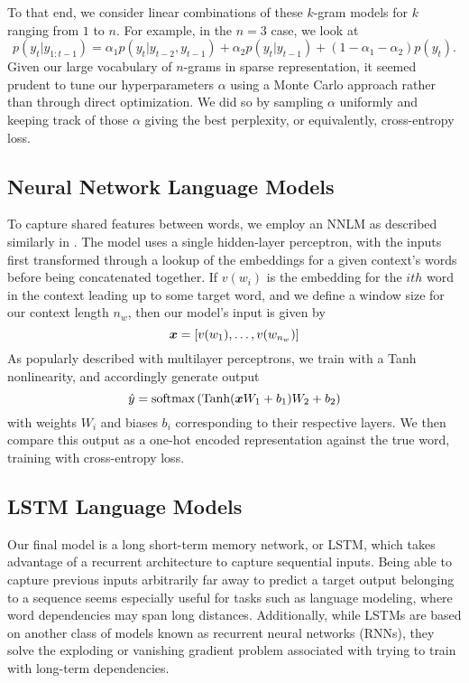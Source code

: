 \documentclass[11pt]{article}
\begin{document}
To that end, we consider linear combinations of these $k$-gram models for $k$ ranging from $1$ to $n$. For example, in the $n=3$ case, we look at
\[p(y_t | y_{1:t-1}) =  \alpha_1 p(y_t | y_{t-2}, y_{t-1}) + \alpha_2 p(y_t | y_{t-1}) + (1 - \alpha_1 - \alpha_2) p(y_t).\]
Given our large vocabulary of $n$-grams in sparse representation, it seemed prudent to tune our hyperparameters $\alpha$ using a Monte Carlo approach rather than through direct optimization. We did so by sampling $\alpha$ uniformly and keeping track of those $\alpha$ giving the best perplexity, or equivalently, cross-entropy loss.

\subsection{Neural Network Language Models}
To capture shared features between words, we employ an NNLM as described similarly in \cite{Bengio:2003:NPL:944919.944966}. The model uses a single hidden-layer perceptron, with the inputs first transformed through a lookup of the embeddings for a given context's words before being concatenated together. If $v(w_i)$ is the embedding for the $ith$ word in the context leading up to some target word, and we define a window size for our context length $n_w$, then our model's input is given by
\[
\boldsymbol{x} = [v(w_1), \ldots, v(w_{n_w})]
\]
As popularly described with multilayer perceptrons, we train with a Tanh nonlinearity, and accordingly generate output
\[
\hat{y} = \text{softmax}\left(\text{Tanh}(\boldsymbol{x} W_1 + b_1)W_2 + b_2\right)
\]
with weights $W_i$ and biases $b_i$ corresponding to their respective layers. We then compare this output as a one-hot encoded representation against the true word, training with cross-entropy loss.

\subsection{LSTM Language Models}
Our final model is a long short-term memory network, or LSTM, which takes advantage of a recurrent architecture to capture sequential inputs. Being able to capture previous inputs arbitrarily far away to predict a target output belonging to a sequence seems especially useful for tasks such as language modeling, where word dependencies may span long distances. Additionally, while LSTMs are based on another class of models known as recurrent neural networks (RNNs), they solve the exploding or vanishing gradient problem associated with trying to train with long-term dependencies.
\end{document}
